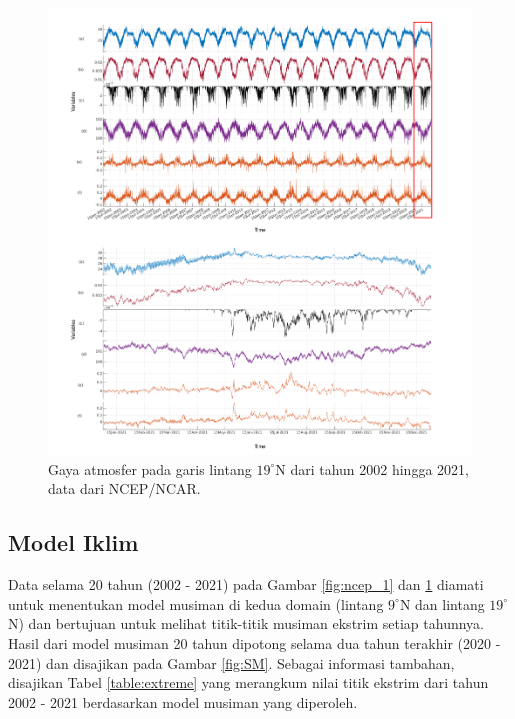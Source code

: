 \begin{spacing}{1.5}
		\begin{figure}[H]
			\centering
			\includegraphics[width=16cm]{contents/final_figure/Figure_5b}
			\caption{Gaya atmosfer pada garis lintang $19^\circ$N dari tahun 2002 hingga 2021, data dari NCEP/NCAR.}
			\label{fig:ncep_2}
		\end{figure}
		
\subsection[Model Iklim]{Model Iklim}
	
		Data selama 20 tahun (2002 - 2021) pada Gambar \ref{fig:ncep_1} dan \ref{fig:ncep_2} diamati untuk menentukan model musiman di kedua domain (lintang $9^\circ$N dan lintang $19^\circ$N) dan bertujuan untuk melihat titik-titik musiman ekstrim setiap tahunnya. Hasil dari model musiman 20 tahun dipotong selama dua tahun terakhir (2020 - 2021) dan disajikan pada Gambar \ref{fig:SM}. Sebagai informasi tambahan, disajikan Tabel \ref{table:extreme} yang merangkum nilai titik ekstrim dari tahun 2002 - 2021 berdasarkan model musiman yang diperoleh.
		

\end{spacing}
